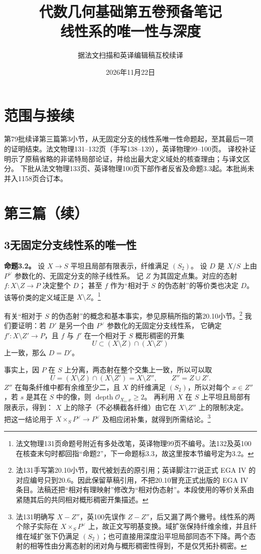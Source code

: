 \documentclass[openany,fontset=fandol]{ctexbook}
\DeclareMathOperator{\depth}{depth}
\newcommand{\OO}{\mathcal O}
\begin{document}
\title{代数几何基础第五卷预备笔记\\线性系的唯一性与深度}
\author{据法文扫描和英译编辑稿互校续译}
\date{2026年11月22日}
\maketitle
\chapter*{范围与接续}
第79批续译第三篇第3小节，从无固定分支的线性系唯一性命题起，至其最后一项的证明结束。法文物理131--132页（手写138--139），英译物理99--100页。
译校补证明示了原稿省略的非诺特局部论证，并给出最大定义域处的核查理由；与译文区分。
下批从法文物理133页、英译物理100页下部作者反省及命题3.3起。本批尚未并入1158页合订本。
\chapter*{第三篇（续）}
\section*{3\quad 无固定分支线性系的唯一性}

\noindent\textbf{命题3.2。}
设 \(X\to S\) 平坦且局部有限表示，纤维满足 \((S_2)\)。
设 \(D\) 是 \(X/S\) 上由 \(P^\vee\) 参数化的、无固定分支的除子线性系。
记 \(Z\) 为其固定点集。对应的态射 \(f:X\setminus Z\to P\) 决定整个 \(D\)；
甚至 \(f\) 作为“相对于 \(S\) 的伪态射”的等价类也决定 \(D\)。
该等价类的定义域正是 \(X\setminus Z\)。\footnote{法文物理131页命题号附近有多处改笔，英译物理99页不编号。法132及英100在核查末句时都回指“命题2”，下一命题标3.3，故这里按本节编号定为3.2。}

有关“相对于 \(S\) 的伪态射”的概念和基本事实，参见原稿所指的第20.10小节。\footnote{法131手写第20.10小节，取代被划去的原引用；英译脚注77说正式 EGA IV 的对应编号只到20.6。因此保留草稿引用，不把20.10冒充正式出版的 EGA IV 条目。法稿还把“相对有理映射”修改为“相对伪态射”。本段使用的等价关系由紧随其后的共同相对概形稠密开集描述。}
我们要证明：若 \(D'\) 是另一个由 \(P^\vee\) 参数化的无固定分支线性系，
它确定 \(f':X\setminus Z'\to P\)，且 \(f\) 与 \(f'\) 在一个相对于 \(S\) 概形稠密的开集
\[
 U\subset (X\setminus Z)\cap(X\setminus Z')
\]
上一致，那么 \(D=D'\)。

事实上，因 \(P\) 在 \(S\) 上分离，两态射在整个交集上一致，所以可以取
\[
 U=(X\setminus Z)\cap(X\setminus Z')=X\setminus Z'',
 \qquad Z''=Z\cup Z'.
\]
\(Z''\) 在每条纤维中都有余维至少二，且 \(X\) 的纤维满足 \((S_2)\)，所以对每个
\(x\in Z''\)，若 \(s\) 是其在 \(S\) 中的像，则 \(\depth\OO_{X_s,x}\geq2\)。
再利用 \(X\) 在 \(S\) 上平坦且局部有限表示，得到：
\(X\) 上的除子（不必横截各纤维）由它在 \(X\setminus Z''\) 上的限制决定。
把这一结论用于 \(X\times_S P^\vee\to P^\vee\) 及相应闭补集，就得到所需结论。\footnote{法131明确写 \(X-Z''\)，英100先误作 \(Z-Z''\)，后又漏了两个撇号。线性系的两个除子实际在 \(X\times_S P^\vee\) 上，故正文写明基变换。域扩张保持纤维余维，并且纤维在域扩张下仍满足 \((S_2)\)；也可直接用深度沿平坦局部同态不下降。两个态射的相等性由分离态射的闭对角与概形稠密性得到，不是仅凭拓扑稠密。}
\end{document}
